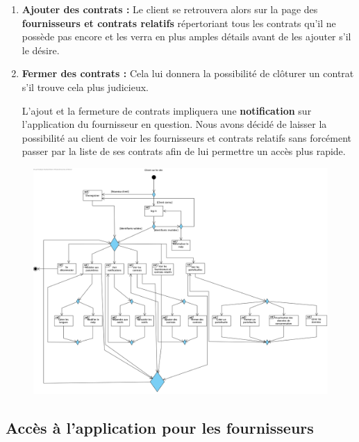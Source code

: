 \begin{enumerate}[-]
\item \textbf{Ajouter des contrats :}
\newline
Le client se retrouvera alors sur la page des \textbf{fournisseurs et contrats relatifs} répertoriant tous les contrats qu’il ne possède pas encore et les verra en plus amples détails avant de les ajouter s’il le désire.

\item \textbf{Fermer des contrats :}
\newline
Cela lui donnera la possibilité de clôturer un contrat s’il trouve cela plus judicieux.

\newline
\newline

L’ajout et la fermeture de contrats impliquera une \textbf{notification} sur l’application du fournisseur en question.
\newline
Nous avons décidé de laisser la possibilité au client de voir les fournisseurs et contrats relatifs sans forcément passer par la liste de ses contrats afin de lui permettre un accès plus rapide.
\end{enumerate}

\newpage

\begin{figure}[h]
\centering
\includegraphics[width = 1\textwidth]{overview/overview-client.png}
\end{figure}

\newpage

\subsection{Accès à l'application pour les fournisseurs}

